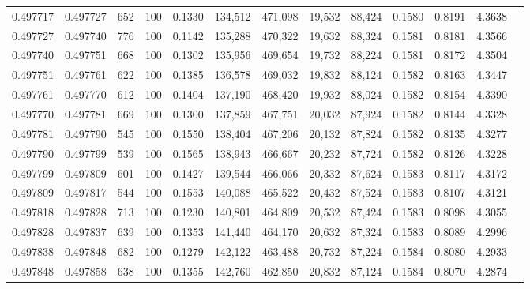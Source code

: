 \begin{tabular}{rrrrrrrrrrrrr}
0.497717 & 0.497727 &   652 & 100 &                                     0.1330 & 134,512 & 471,098 &  19,532 &  88,424 & 0.1580 & 0.8191 & 4.3638 \\
0.497727 & 0.497740 &   776 & 100 &                                     0.1142 & 135,288 & 470,322 &  19,632 &  88,324 & 0.1581 & 0.8181 & 4.3566 \\
0.497740 & 0.497751 &   668 & 100 &                                     0.1302 & 135,956 & 469,654 &  19,732 &  88,224 & 0.1581 & 0.8172 & 4.3504 \\
0.497751 & 0.497761 &   622 & 100 &                                     0.1385 & 136,578 & 469,032 &  19,832 &  88,124 & 0.1582 & 0.8163 & 4.3447 \\
0.497761 & 0.497770 &   612 & 100 &                                     0.1404 & 137,190 & 468,420 &  19,932 &  88,024 & 0.1582 & 0.8154 & 4.3390 \\
0.497770 & 0.497781 &   669 & 100 &                                     0.1300 & 137,859 & 467,751 &  20,032 &  87,924 & 0.1582 & 0.8144 & 4.3328 \\
0.497781 & 0.497790 &   545 & 100 &                                     0.1550 & 138,404 & 467,206 &  20,132 &  87,824 & 0.1582 & 0.8135 & 4.3277 \\
0.497790 & 0.497799 &   539 & 100 &                                     0.1565 & 138,943 & 466,667 &  20,232 &  87,724 & 0.1582 & 0.8126 & 4.3228 \\
0.497799 & 0.497809 &   601 & 100 &                                     0.1427 & 139,544 & 466,066 &  20,332 &  87,624 & 0.1583 & 0.8117 & 4.3172 \\
0.497809 & 0.497817 &   544 & 100 &                                     0.1553 & 140,088 & 465,522 &  20,432 &  87,524 & 0.1583 & 0.8107 & 4.3121 \\
0.497818 & 0.497828 &   713 & 100 &                                     0.1230 & 140,801 & 464,809 &  20,532 &  87,424 & 0.1583 & 0.8098 & 4.3055 \\
0.497828 & 0.497837 &   639 & 100 &                                     0.1353 & 141,440 & 464,170 &  20,632 &  87,324 & 0.1583 & 0.8089 & 4.2996 \\
0.497838 & 0.497848 &   682 & 100 &                                     0.1279 & 142,122 & 463,488 &  20,732 &  87,224 & 0.1584 & 0.8080 & 4.2933 \\
0.497848 & 0.497858 &   638 & 100 &                                     0.1355 & 142,760 & 462,850 &  20,832 &  87,124 & 0.1584 & 0.8070 & 4.2874 \\

\end{tabular}
